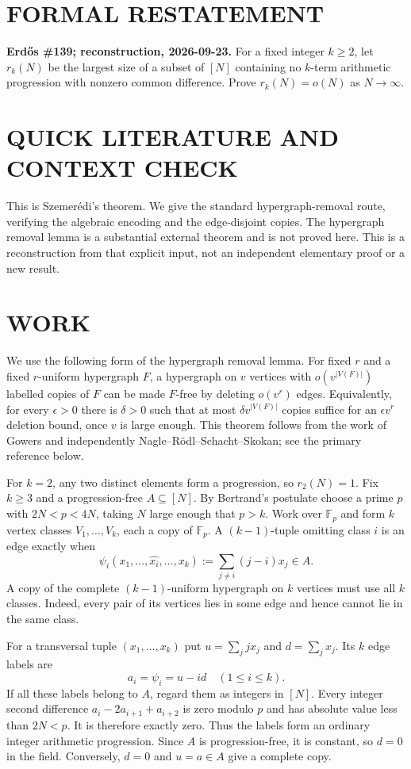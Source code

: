 \section{FORMAL RESTATEMENT}
\textbf{Erd\H{o}s \#139; reconstruction, 2026-09-23.}
For a fixed integer $k\ge2$, let $r_k(N)$ be the largest size of a subset
of $[N]$ containing no $k$-term arithmetic progression with nonzero common
difference. Prove $r_k(N)=o(N)$ as $N\to\infty$.

\section{QUICK LITERATURE AND CONTEXT CHECK}
This is Szemer\'edi's theorem. We give the standard hypergraph-removal
route, verifying the algebraic encoding and the edge-disjoint copies.
The hypergraph removal lemma is a substantial external theorem and is
not proved here. This is a reconstruction from that explicit input,
not an independent elementary proof or a new result.

\section{WORK}
We use the following form of the hypergraph removal lemma. For fixed
$r$ and a fixed $r$-uniform hypergraph $F$, a hypergraph on $v$ vertices
with $o(v^{|V(F)|})$ labelled copies of $F$ can be made $F$-free by
deleting $o(v^r)$ edges. Equivalently, for every $\epsilon>0$ there is
$\delta>0$ such that at most $\delta v^{|V(F)|}$ copies suffice for
an $\epsilon v^r$ deletion bound, once $v$ is large enough.
This theorem follows from the work of Gowers and independently
Nagle--R\"odl--Schacht--Skokan; see the primary reference below.

For $k=2$, any two distinct elements form a progression, so $r_2(N)=1$.
Fix $k\ge3$ and a progression-free $A\subseteq[N]$. By Bertrand's
postulate choose a prime $p$ with $2N<p<4N$, taking $N$ large enough
that $p>k$. Work over $\mathbb F_p$ and form $k$ vertex classes
$V_1,\ldots,V_k$, each a copy of $\mathbb F_p$.
A $(k-1)$-tuple omitting class $i$ is an edge exactly when
\[
 \psi_i(x_1,\ldots,\widehat{x_i},\ldots,x_k)
 :=\sum_{j\ne i}(j-i)x_j\in A.                         \tag{1}
\]
A copy of the complete $(k-1)$-uniform hypergraph on $k$ vertices must
use all $k$ classes. Indeed, every pair of its vertices lies in some
edge and hence cannot lie in the same class.

For a transversal tuple $(x_1,\ldots,x_k)$ put
$u=\sum_jjx_j$ and $d=\sum_jx_j$. Its $k$ edge labels are
\[
 a_i=\psi_i=u-id\quad(1\le i\le k).                     \tag{2}
\]
If all these labels belong to $A$, regard them as integers in $[N]$.
Every integer second difference $a_i-2a_{i+1}+a_{i+2}$ is zero modulo
$p$ and has absolute value less than $2N<p$. It is therefore exactly
zero. Thus the labels form an ordinary integer arithmetic progression.
Since $A$ is progression-free, it is constant, so $d=0$ in the field.
Conversely, $d=0$ and $u=a\in A$ give a complete copy.


